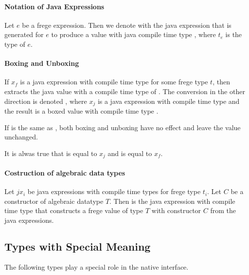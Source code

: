 \paragraph*{Notation of Java Expressions} Let $e$ be a frege expression. Then we denote with  the java expression that is generated for $e$ to produce a value with java compile time type , where $t_e$ is the type of $e$.

\paragraph*{Boxing and Unboxing}
If $x_f$ is a java expression with compile time type  for some frege type $t$, then  extracts the java value with a compile time type of . The conversion in the other direction is denoted , where $x_j$ is a java expression with compile time type  and the result is a boxed value with compile time type .

If  is the same as , both boxing and unboxing have no effect and leave the value unchanged.

It is alwas true that  is equal to $x_j$ and  is equal to $x_f$.

\paragraph*{Costruction of algebraic data types}

Let $jx_i$ be java expressions with compile time types  for frege type $t_i$. Let $C$ be a constructor of algebraic datatype $T$. Then  is the java expression with compile time type  that constructs a frege value of type $T$ with constructor $C$ from the java expressions.


\subsection*{Types with Special Meaning}

The following types play a special role in the native interface.

